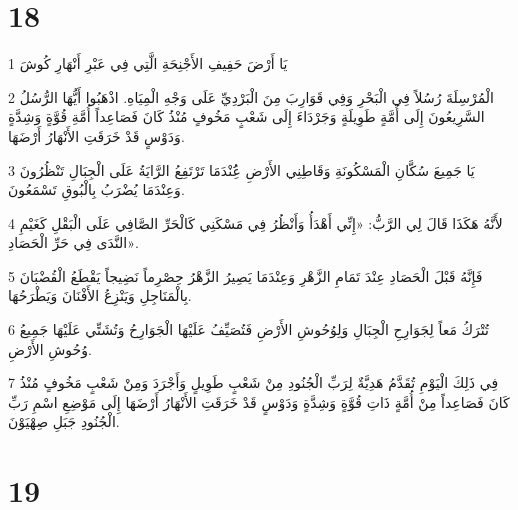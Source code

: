 \chapter{18}

\par 1 يَا أَرْضَ حَفِيفِ الأَجْنِحَةِ الَّتِي فِي عَبْرِ أَنْهَارِ كُوشَ
\par 2 الْمُرْسِلَةَ رُسُلاً فِي الْبَحْرِ وَفِي قَوَارِبَ مِنَ الْبَرْدِيِّ عَلَى وَجْهِ الْمِيَاهِ. اذْهَبُوا أَيُّهَا الرُّسُلُ السَّرِيعُونَ إِلَى أُمَّةٍ طَوِيلَةٍ وَجَرْدَاءَ إِلَى شَعْبٍ مَخُوفٍ مُنْذُ كَانَ فَصَاعِداً أُمَّةِ قُوَّةٍ وَشِدَّةٍ وَدَوْسٍ قَدْ خَرَقَتِ الأَنْهَارُ أَرْضَهَا.
\par 3 يَا جَمِيعَ سُكَّانِ الْمَسْكُونَةِ وَقَاطِنِي الأَرْضِ عَُِنْدَمَا تَرْتَفِعُ الرَّايَةُ عَلَى الْجِبَالِ تَنْظُرُونَ وَعِنْدَمَا يُضْرَبُ بِالْبُوقِ تَسْمَعُونَ.
\par 4 لأَنَّهُ هَكَذَا قَالَ لِي الرَّبُّ: «إِنِّي أَهْدَأُ وَأَنْظُرُ فِي مَسْكَنِي كَالْحَرِّ الصَّافِي عَلَى الْبَقْلِ كَغَيْمِ النَّدَى فِي حَرِّ الْحَصَادِ».
\par 5 فَإِنَّهُ قَبْلَ الْحَصَادِ عِنْدَ تَمَامِ الزَّهْرِ وَعِنْدَمَا يَصِيرُ الزَّهْرُ حِصْرِماً نَضِيجاً يَقْطَعُ الْقُضْبَانَ بِالْمَنَاجِلِ وَيَنْزِعُ الأَفْنَانَ وَيَطْرَحُهَا.
\par 6 تُتْرَكُ مَعاً لِجَوَارِحِ الْجِبَالِ وَلِوُحُوشِ الأَرْضِ فَتُصَيِّفُ عَلَيْهَا الْجَوَارِحُ وَتُشَتِّي عَلَيْهَا جَمِيعُ وُحُوشِ الأَرْضِ.
\par 7 فِي ذَلِكَ الْيَوْمِ تُقَدَّمُ هَدِيَّةٌ لِرَبِّ الْجُنُودِ مِنْ شَعْبٍ طَوِيلٍ وَأَجْرَدَ وَمِنْ شَعْبٍ مَخُوفٍ مُنْذُ كَانَ فَصَاعِداً مِنْ أُمَّةٍ ذَاتِ قُوَّةٍ وَشِدَّةٍ وَدَوْسٍ قَدْ خَرَقَتِ الأَنْهَارُ أَرْضَهَا إِلَى مَوْضِعِ اسْمِ رَبِّ الْجُنُودِ جَبَلِ صِهْيَوْنَ.

\chapter{19}

